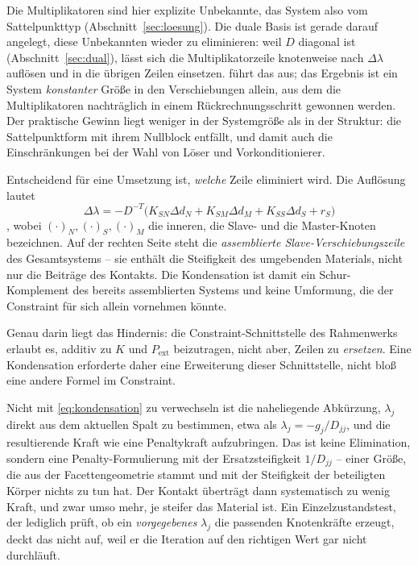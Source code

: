 \documentclass[a4paper,11pt]{article}
\def\bm#1{#1}%
\def\tilde#1{#1}%
\begin{document}
Die Multiplikatoren sind hier explizite Unbekannte, das System also vom Sattelpunkttyp
(Abschnitt~\ref{sec:loesung}). Die duale Basis ist gerade darauf angelegt, diese Unbekannten wieder
zu eliminieren: weil $\tilde{\bm D}$ diagonal ist (Abschnitt~\ref{sec:dual}), lässt sich die
Multiplikatorzeile knotenweise nach $\Delta\bm\lambda$ auflösen und in die übrigen Zeilen einsetzen.
\citet[Gl.~(3.62)--(3.65)]{farah} führt das aus; das Ergebnis ist ein System \emph{konstanter}
Größe in den Verschiebungen allein, aus dem die Multiplikatoren nachträglich in einem
Rückrechnungsschritt gewonnen werden. Der praktische Gewinn liegt weniger in der Systemgröße als in
der Struktur: die Sattelpunktform mit ihrem Nullblock entfällt, und damit auch die Einschränkungen
bei der Wahl von Löser und Vorkonditionierer.

Entscheidend für eine Umsetzung ist, \emph{welche} Zeile eliminiert wird. Die Auflösung lautet
\begin{equation}
\Delta\bm\lambda = -\tilde{\bm D}^{-T}\big(\bm K_{SN}\Delta\bm d_N + \tilde{\bm K}_{SM}\Delta\bm d_M
+ \tilde{\bm K}_{SS}\Delta\bm d_S + \bm r_S\big)
\label{eq:kondensation}
\end{equation}
\citep[Gl.~(3.63)]{farah}, wobei $(\cdot)_N,(\cdot)_S,(\cdot)_M$ die inneren, die Slave- und die
Master-Knoten bezeichnen. Auf der rechten Seite steht die \emph{assemblierte Slave-Verschiebungs\-zeile}
des Gesamtsystems -- sie enthält die Steifigkeit des umgebenden Materials, nicht nur die Beiträge
des Kontakts. Die Kondensation ist damit ein Schur-Komplement des bereits assemblierten Systems und
keine Umformung, die der Constraint für sich allein vornehmen könnte.

Genau darin liegt das Hindernis: die Constraint-Schnittstelle des Rahmenwerks erlaubt es, additiv
zu $\bm K$ und $\bm P_{\text{ext}}$ beizutragen, nicht aber, Zeilen zu \emph{ersetzen}. Eine
Kondensation erforderte daher eine Erweiterung dieser Schnittstelle, nicht bloß eine andere Formel
im Constraint.

Nicht mit \eqref{eq:kondensation} zu verwechseln ist die naheliegende Abkürzung, $\lambda_j$ direkt
aus dem aktuellen Spalt zu bestimmen, etwa als $\lambda_j=-\tilde g_j/\tilde D_{jj}$, und die
resultierende Kraft wie eine Penaltykraft aufzubringen. Das ist keine Elimination, sondern eine
Penalty-Formulierung mit der Ersatzsteifigkeit $1/\tilde D_{jj}$ -- einer Größe, die aus der
Facettengeometrie stammt und mit der Steifigkeit der beteiligten Körper nichts zu tun hat. Der
Kontakt überträgt dann systematisch zu wenig Kraft, und zwar umso mehr, je steifer das Material
ist. Ein Einzelzustandstest, der lediglich prüft, ob ein \emph{vorgegebenes} $\lambda_j$ die
passenden Knotenkräfte erzeugt, deckt das nicht auf, weil er die Iteration auf den richtigen Wert
gar nicht durchläuft.
\end{document}
